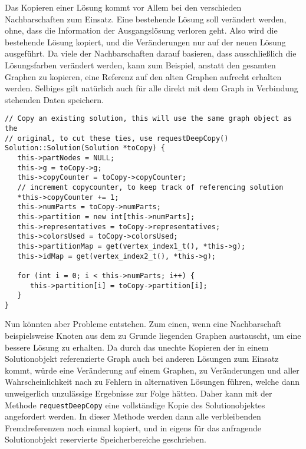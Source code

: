 Das Kopieren einer Lösung kommt vor Allem bei den verschieden Nachbarschaften zum Einsatz. Eine bestehende Lösung soll verändert werden, ohne, dass die Information der Ausgangslösung verloren geht. Also wird
die bestehende Lösung kopiert, und die Veränderungen nur auf der neuen Lösung ausgeführt. Da viele der Nachbarschaften darauf basieren, dass ausschließlich die Lösungsfarben verändert werden, kann zum Beispiel, 
anstatt den gesamten Graphen zu kopieren, eine Referenz auf den alten Graphen aufrecht erhalten werden. Selbiges gilt natürlich auch für alle direkt mit dem Graph in Verbindung stehenden Daten speichern. 

\singlespacing
\begin{lstlisting}[caption={Der Kopierkonstruktor der Solutionklasse},label={lst:copy}]
// Copy an existing solution, this will use the same graph object as the 
// original, to cut these ties, use requestDeepCopy()
Solution::Solution(Solution *toCopy) {
   this->partNodes = NULL;
   this->g = toCopy->g;
   this->copyCounter = toCopy->copyCounter;
   // increment copycounter, to keep track of referencing solution
   *this->copyCounter += 1;
   this->numParts = toCopy->numParts;
   this->partition = new int[this->numParts];
   this->representatives = toCopy->representatives;
   this->colorsUsed = toCopy->colorsUsed;
   this->partitionMap = get(vertex_index1_t(), *this->g);
   this->idMap = get(vertex_index2_t(), *this->g);
   
   for (int i = 0; i < this->numParts; i++) {
      this->partition[i] = toCopy->partition[i];
   }
}
\end{lstlisting}

Nun könnten aber Probleme entstehen. Zum einen, wenn eine Nachbarschaft beispielsweise Knoten aus dem zu Grunde liegenden Graphen austauscht, um eine bessere Lösung zu erhalten. Da durch das unechte Kopieren
der in einem Solutionobjekt referenzierte Graph auch bei anderen Lösungen zum Einsatz kommt, würde eine Veränderung auf einem Graphen, zu Veränderungen und aller Wahrscheinlichkeit nach zu Fehlern in alternativen
Lösungen führen, welche dann unweigerlich unzulässige Ergebnisse zur Folge hätten. Daher kann mit der Methode \texttt{requestDeepCopy} eine vollständige Kopie des Solutionobjektes angefordert werden. In dieser
Methode werden dann alle verbleibenden Fremdreferenzen noch einmal kopiert, und in eigens für das anfragende Solutionobjekt reservierte Speicherbereiche geschrieben.

